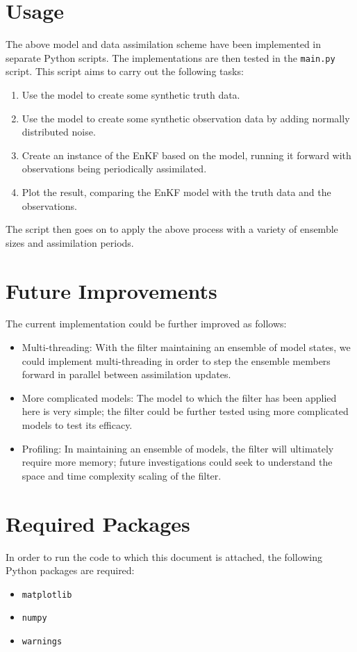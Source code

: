 \documentclass[a4paper, 12pt, twoside]{article}
\begin{document}
\section{Usage}\label{sec:usage}

The above model and data assimilation scheme have been implemented in separate
Python scripts.
The implementations are then tested in the \texttt{main.py} script.
This script aims to carry out the following tasks:
\begin{enumerate}
    \item Use the model to create some synthetic truth data.
    \item Use the model to create some synthetic observation data by adding
        normally distributed noise.
    \item Create an instance of the EnKF based on the model, running it forward
        with observations being periodically assimilated.
    \item Plot the result, comparing the EnKF model with the truth data and the
        observations.
\end{enumerate}

The script then goes on to apply the above process with a variety of ensemble
sizes and assimilation periods.

\section{Future Improvements}\label{sec:improvements}

The current implementation could be further improved as follows:
\begin{itemize}
    \item Multi-threading: With the filter maintaining an ensemble of model
        states, we could implement multi-threading in order to step the ensemble
        members forward in parallel between assimilation updates.
    \item More complicated models: The model to which the filter has been
        applied here is very simple; the filter could be further tested using
        more complicated models to test its efficacy.
    \item Profiling: In maintaining an ensemble of models, the filter will
        ultimately require more memory; future investigations could seek to
        understand the space and time complexity scaling of the filter.
\end{itemize}




\newpage
\appendix
\section{Required Packages}\label{sec:requirements}

In order to run the code to which this document is attached, the following
Python packages are required:
\begin{itemize}
    \item \texttt{matplotlib}
    \item \texttt{numpy}
    \item \texttt{warnings}
\end{itemize}
\end{document}
